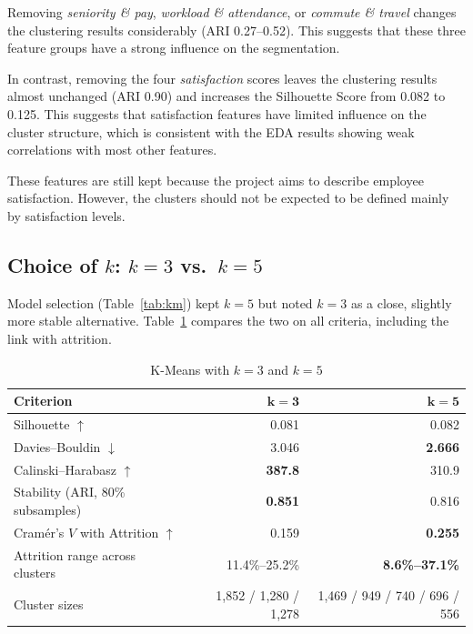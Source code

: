 \documentclass[12pt,a4paper]{article}
\begin{document}
Removing \emph{seniority \& pay}, \emph{workload \& attendance},
or \emph{commute \& travel} changes the clustering results
considerably (ARI 0.27--0.52). This suggests that these three
feature groups have a strong influence on the segmentation.

In contrast, removing the four \emph{satisfaction} scores
leaves the clustering results almost unchanged (ARI 0.90)
and increases the Silhouette Score from 0.082 to 0.125.
This suggests that satisfaction features have limited
influence on the cluster structure, which is consistent
with the EDA results showing weak correlations with most
other features.

These features are still kept because the project aims to
describe employee satisfaction. However, the clusters should
not be expected to be defined mainly by satisfaction levels.

\subsection{Choice of $k$: $k=3$ vs.\ $k=5$}

Model selection (Table~\ref{tab:km}) kept $k=5$ but noted $k=3$ as a close,
slightly more stable alternative. Table~\ref{tab:k3k5} compares the two on
all criteria, including the link with attrition.

\begin{table}[H]
\centering
\caption{K-Means with $k=3$ and $k=5$}
\label{tab:k3k5}
\small
\begin{tabular}{lrr}
\toprule
\textbf{Criterion} & $\boldsymbol{k=3}$ & $\boldsymbol{k=5}$\\
\midrule
Silhouette $\uparrow$          & 0.081 & 0.082\\
Davies--Bouldin $\downarrow$   & 3.046 & \textbf{2.666}\\
Calinski--Harabasz $\uparrow$  & \textbf{387.8} & 310.9\\
Stability (ARI, 80\% subsamples) & \textbf{0.851} & 0.816\\
Cramér's $V$ with Attrition $\uparrow$ & 0.159 & \textbf{0.255}\\
Attrition range across clusters & 11.4\%--25.2\% & \textbf{8.6\%--37.1\%}\\
Cluster sizes & 1,852 / 1,280 / 1,278 & 1,469 / 949 / 740 / 696 / 556\\
\bottomrule
\end{tabular}
\end{table}
\end{document}
